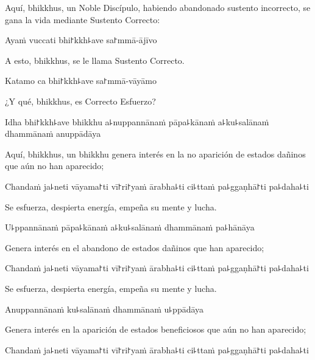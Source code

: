 \begin{english}
	Aquí, bhikkhus, un Noble Discípulo, habiendo abandonado sustento incorrecto, se gana la vida mediante Sustento Correcto:
\end{english}

Ayaṁ vuccati bhi꜓kkh꜕ave sa꜓mmā-ājīvo

\begin{english}
	A esto, bhikkhus, se le llama Sustento Correcto.
\end{english}

Katamo ca bhi꜓kkh꜕ave sa꜓mmā-vāyāmo

\begin{english}
	¿Y qué, bhikkhus, es Correcto Esfuerzo?
\end{english}

Idha bhi꜓kkh꜕ave bhikkhu a꜕nuppannānaṁ pāpa꜕kānaṁ a꜕ku꜕salānaṁ dhammānaṁ anuppādāya

\begin{english}
	Aquí, bhikkhus, un bhikkhu genera interés en la no aparición de estados dañinos que aún no han aparecido;
	
\end{english}

Chandaṁ ja꜕neti vāyama꜓ti vī꜓ri꜓yaṁ ārabha꜕ti ci꜕ttaṁ pa꜕ggaṇhā꜓ti pa꜕daha꜕ti

\begin{english}
	Se esfuerza, despierta energía, empeña su mente y lucha.
\end{english}

U꜕ppannānaṁ pāpa꜕kānaṁ a꜕ku꜕salānaṁ dhammānaṁ pa꜕hānāya

\begin{english}
	Genera interés en el abandono de estados dañinos que han aparecido;
\end{english}

Chandaṁ ja꜕neti vāyama꜓ti vī꜓ri꜓yaṁ ārabha꜕ti ci꜕ttaṁ pa꜕ggaṇhā꜓ti pa꜕daha꜕ti

\begin{english}
	Se esfuerza, despierta energía, empeña su mente y lucha.
\end{english}

Anuppannānaṁ ku꜕salānaṁ dhammānaṁ u꜕ppādāya

\begin{english}
	Genera interés en la aparición de estados beneficiosos que aún no han aparecido;
\end{english}

Chandaṁ ja꜕neti vāyama꜓ti vī꜓ri꜓yaṁ ārabha꜕ti ci꜕ttaṁ pa꜕ggaṇhā꜓ti pa꜕daha꜕ti

